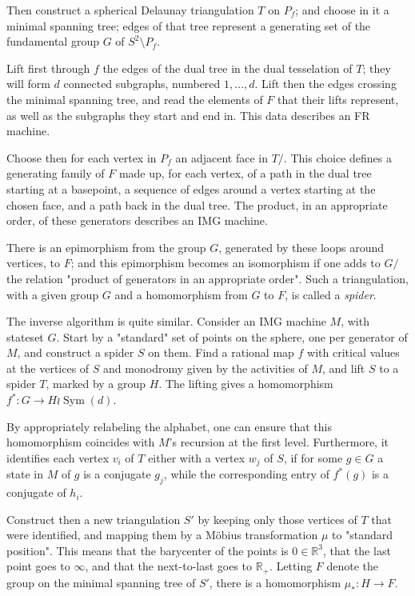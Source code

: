 \documentclass[a4paper,11pt]{report}
\begin{document}
{{{ Then construct a spherical Delaunay triangulation $T$ on $P_f$; and choose in it a minimal spanning tree; edges of that tree represent a
generating set of the fundamental group $G$ of $S^2\setminus P_f$. 

 Lift first through $f$ the edges of the dual tree in the dual tesselation of $T$; they will form $d$ connected subgraphs, numbered $1,\ldots,d$. Lift then the edges crossing the minimal spanning tree, and read the
elements of $F$ that their lifts represent, as well as the subgraphs they start and end in.
This data describes an FR machine. 

 Choose then for each vertex in $P_f$ an adjacent face in $T/$. This choice defines a generating family of $F$ made up, for each vertex, of a path in the dual tree starting at a basepoint,
a sequence of edges around a vertex starting at the chosen face, and a path
back in the dual tree. The product, in an appropriate order, of these
generators describes an IMG machine. 

 There is an epimorphism from the group $G$, generated by these loops around vertices, to $F$; and this epimorphism becomes an isomorphism if one adds to $G/$ the relation "product of generators in an appropriate order". Such a
triangulation, with a given group $G$ and a homomorphism from $G$ to $F$, is called a \emph{spider}. 

 The inverse algorithm is quite similar. Consider an IMG machine $M$, with stateset $G$. Start by a "standard" set of points on the sphere, one per generator of $M$, and construct a spider $S$ on them. Find a rational map $f$ with critical values at the vertices of $S$ and monodromy given by the activities of $M$, and lift $S$ to a spider $T$, marked by a group $H$. The lifting gives a homomorphism $f^*:G\to H\wr \mathop{Sym}(d)$. 

 By appropriately relabeling the alphabet, one can ensure that this
homomorphism coincides with $M$'s recursion at the first level. Furthermore, it identifies each vertex $v_i$ of $T$ either with a vertex $w_j$ of $S$, if for some $g\in G$ a state in $M$ of $g$ is a conjugate $g_j$, while the corresponding entry of $f^*(g)$ is a conjugate of $h_i$. 

 Construct then a new triangulation $S'$ by keeping only those vertices of $T$ that were identified, and mapping them by a M{\"o}bius transformation $\mu$ to "standard position". This means that the barycenter of the points is $0\in \mathbb R^3$, that the last point goes to $\infty$, and that the next-to-last goes to $\mathbb R_+$. Letting $F$ denote the group on the minimal spanning tree of $S'$, there is a homomorphism $\mu_*:H\to F$. 

}}}
\end{document}
